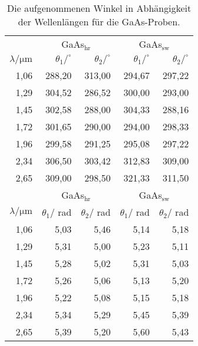 \begin{table}[htpb]
	\centering
	\caption{Die aufgenommenen Winkel in Abhängigkeit der Wellenlängen für die GaAs-Proben.}
	\label{tab:messwerte2}
	\begin{tabular}{r|rr|rr}
		\hline\hline
		&	\multicolumn{2}{c|}{GaAs$_\text{hr}$}&	\multicolumn{2}{c|}{GaAs$_\text{sw}$} \\ 
		$\lambda / \si{\micro\meter}$ & $\theta_{1} / ^\circ$  & $\theta_{2} / ^\circ$ & $\theta_{1} / ^\circ$ & $\theta_{2} / ^\circ$ \\
		\hline\hline
		1,06	&	288,20	&	313,00	&	294,67	&	297,22	\\
		1,29	&   304,52	&	286,52	&	300,00	&	293,00  \\
		1,45	&	302,58  &	288,00	&	304,33	&	288,16	\\
		1,72	&   301,65	&	290,00	&	294,00	&	298,33	\\
		1,96	&	299,58	&	291,25	&	295,08	&	297,22	\\
		2,34	&	306,50	&	303,42	&	312,83	&	309,00	\\
		2,65	&	309,00  &	298,50	&	321,33	&	311,50	\\
		\hline\hline
		&	\multicolumn{2}{c|}{GaAs$_\text{hr}$}&	\multicolumn{2}{c|}{GaAs$_\text{sw}$} \\ 
		$\lambda / \si{\micro\meter}$ & $\theta_{1} /$ rad  & $\theta_{2} /$ rad & $\theta_{1} /$ rad & $\theta_{2} /$ rad \\
		1,06	&	5,03	&	5,46	&	5,14	&	5,18	\\
		1,29	&   5,31	&	5,00	&	5,23 	& 	5,11	\\
		1,45	&	5,28  	&	5,02	&	5,31	 &	5,03	\\
		1,72	&   5,26	&	5,06	&	5,13	 &	5,20	\\
		1,96	&	5,22	&	5,08	&	5,15	 &	5,18	\\
		2,34	&	5,34	&	5,29	&	5,45	 &	5,39	\\
		2,65	&	5,39    &	5,20	&	5,60	 &	5,43	\\
		\bottomrule
	\end{tabular}
\end{table}

